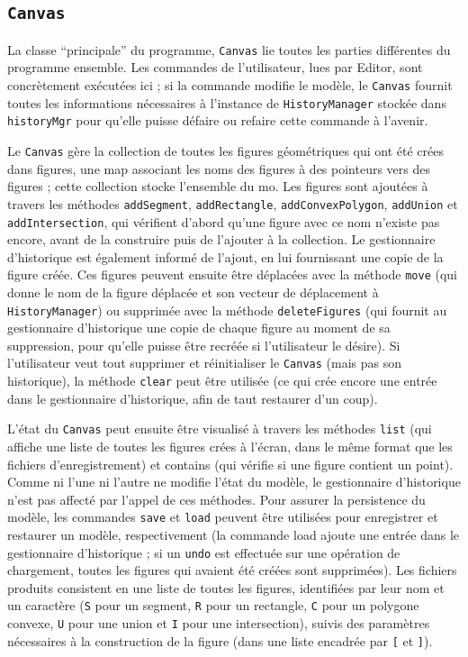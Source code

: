 \documentclass[11pt,a4paper]{article}
\begin{document}
	\subsection{\texttt{Canvas}}
	La classe “principale” du programme, \texttt{Canvas} lie toutes les parties différentes du programme ensemble. Les commandes de l'utilisateur, lues par Editor, sont concrètement exécutées ici ; si la commande modifie le modèle, le \texttt{Canvas} fournit toutes les informations nécessaires à l'instance de \texttt{HistoryManager} stockée dans \texttt{historyMgr} pour qu'elle puisse défaire ou refaire cette commande à l'avenir.
	
	Le \texttt{Canvas} gère la collection de toutes les figures géométriques qui ont été crées dans figures, une map associant les noms des figures à des pointeurs vers des figures ; cette collection stocke l'ensemble du mo. Les figures sont ajoutées à travers les méthodes \texttt{addSegment}, \texttt{addRectangle}, \texttt{addConvexPolygon}, \texttt{addUnion} et \texttt{addIntersection}, qui vérifient d'abord qu'une figure avec ce nom n'existe pas encore, avant de la construire puis de l'ajouter à la collection. Le gestionnaire d'historique est également informé de l'ajout, en lui fournissant une copie de la figure créée. Ces figures peuvent ensuite être déplacées avec la méthode \texttt{move} (qui donne le nom de la figure déplacée et son vecteur de déplacement à \texttt{HistoryManager}) ou supprimée avec la méthode \texttt{deleteFigures} (qui fournit au gestionnaire d'historique une copie de chaque figure au moment de sa suppression, pour qu'elle puisse être recréée si l'utilisateur le désire). Si l'utilisateur veut tout supprimer et réinitialiser le \texttt{Canvas} (mais pas son historique), la méthode \texttt{clear} peut être utilisée (ce qui crée encore une entrée dans le gestionnaire d'historique, afin de taut restaurer d'un coup).
	
	L'état du \texttt{Canvas} peut ensuite être visualisé à travers les méthodes \texttt{list} (qui affiche une liste de toutes les figures crées à l'écran, dans le même format que les fichiers d'enregistrement) et contains (qui vérifie si une figure contient un point). Comme ni l'une ni l'autre ne modifie l'état du modèle, le gestionnaire d'historique n'est pas affecté par l'appel de ces méthodes.
	Pour assurer la persistence du modèle, les commandes \texttt{save} et \texttt{load} peuvent être utilisées pour enregistrer et restaurer un modèle, respectivement (la commande load ajoute une entrée dans le gestionnaire d'historique ; si un \texttt{undo} est effectuée sur une opération de chargement, toutes les figures qui avaient été créées sont supprimées). Les fichiers produits consistent en une liste de toutes les figures, identifiées par leur nom et un caractère (\texttt{S} pour un segment, \texttt{R} pour un rectangle, \texttt{C} pour un polygone convexe, \texttt{U} pour une union et \texttt{I} pour une intersection), suivis des paramètres nécessaires à la construction de la figure (dans une liste encadrée par \texttt{[} et \texttt{]}).
	
\end{document}
